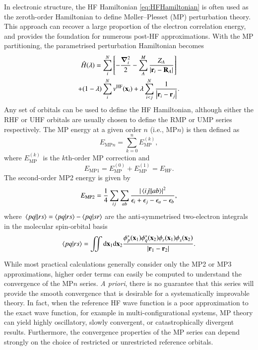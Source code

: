 \documentclass[aps,prb,reprint,noshowkeys,superscriptaddress]{revtex4-1}
\newcommand{\latin}[1]{#1}
\newcommand{\ie}{\latin{i.e.}}
\newcommand{\hH}{\Hat{H}}
\begin{document}
In electronic structure, the HF Hamiltonian \eqref{eq:HFHamiltonian} is often used as the zeroth-order Hamiltonian
to define M\o{}ller--Plesset (MP) perturbation theory.\cite{Moller_1934}
This approach can recover a large proportion of the electron correlation energy,\cite{Lowdin_1955a,Lowdin_1955b,Lowdin_1955c} 
and provides the foundation for numerous post-HF approximations.
With the MP partitioning, the parametrised perturbation Hamiltonian becomes
\begin{multline}\label{eq:MPHamiltonian}
    \hH(\lambda) =   
     \sum_{i}^{N} \qty[ - \frac{\grad_i^2}{2} - \sum_{A}^{M} \frac{Z_A}{\abs{\vb{r}_i-\vb{R}_A}} ]
    \\
    + (1-\lambda) \sum_{i}^{N} v^{\text{HF}}(\vb{x}_i)
    + \lambda\sum_{i<j}^{N}\frac{1}{\abs{\vb{r}_i-\vb{r}_j}}.
\end{multline}
Any set of orbitals can be used to define the HF Hamiltonian, although either the RHF or UHF orbitals are usually chosen to 
define the RMP or UMP series respectively.
The MP energy at a given order $n$ (\ie, MP$n$) is then defined as
\begin{equation}
	E_{\text{MP}n}= \sum_{k=0}^n E_{\text{MP}}^{(k)},
\end{equation}
where $E_{\text{MP}}^{(k)}$ is the $k$th-order MP correction and 
\begin{equation}
E_{\text{MP1}} =  E_{\text{MP}}^{(0)} + E_{\text{MP}}^{(1)} = E_\text{HF}.
\end{equation}
The second-order MP2 energy is given by
\begin{equation}\label{eq:EMP2}
	E_{\text{MP2}} = \frac{1}{4} \sum_{ij} \sum_{ab} \frac{\abs{\mel{ij}{}{ab}}^2}{\epsilon_i + \epsilon_j - \epsilon_a - \epsilon_b},
\end{equation}
where $\mel{pq}{}{rs} = \braket{pq}{rs} - \braket{pq}{sr}$ are the anti-symmetrised two-electron integrals
in the molecular spin-orbital basis\cite{Gill_1994}
\begin{equation}
	\braket{pq}{rs} 
    = \iint \dd\vb{x}_1\dd\vb{x}_2
    \frac{\phi^{*}_p(\vb{x}_1)\phi^{*}_q(\vb{x}_2)\phi^{\vphantom{*}}_r(\vb{x}_1)\phi^{\vphantom{*}}_s(\vb{x}_2)}%
      {\abs{\vb{r}_1 - \vb{r}_2}}.
\end{equation}

While most practical calculations generally consider only the MP2 or MP3 approximations, higher order terms can 
easily be computed to understand the convergence of the MP$n$ series.\cite{Handy_1985}
\textit{A priori}, there is no guarantee that this series will provide the smooth convergence that is desirable for a
systematically improvable theory.
In fact, when the reference HF wave function is a poor approximation to the exact wave function, 
for example in multi-configurational systems, MP theory can yield highly oscillatory, 
slowly convergent, or catastrophically divergent results.\cite{Gill_1986,Gill_1988,Handy_1985,Lepetit_1988,Leininger_2000}
Furthermore, the convergence properties of the MP series can depend strongly on the choice of restricted or
unrestricted reference orbitals.
\end{document}
